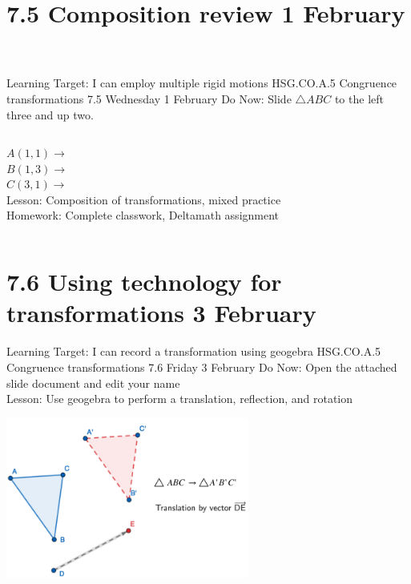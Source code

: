 \documentclass[onlytextwidth, aspectratio=169]{beamer}
\begin{document}
\section{7.5 Composition review \hfill 1 February \,}
\begin{frame}{Learning Target: I can employ multiple rigid motions}
  {HSG.CO.A.5 Congruence transformations \hfill \alert{7.5 Wednesday 1 February}}
  Do Now: Slide $\triangle ABC$ to the left three and up two.  \vspace{0.5cm}
  \begin{columns}
    $A(1,1) \rightarrow$ \\[0.3cm]
    $B(1,3) \rightarrow$ \\[0.3cm]
    $C(3,1) \rightarrow$ \\[0.3cm]
    Lesson: Composition of transformations, mixed practice \\[0.5cm]
    Homework: Complete classwork, Deltamath assignment
    \begin{flushright}
    \end{flushright}
  \end{columns}
\end{frame}

\section{7.6 Using technology for transformations \hfill 3 February \,}
\begin{frame}{Learning Target: I can record a transformation using geogebra}
  {HSG.CO.A.5 Congruence transformations \hfill \alert{7.6 Friday 3 February}}
  Do Now: Open the attached slide document and edit your name \\
  Lesson: Use geogebra to perform a translation, reflection, and rotation \\
  \begin{center}
    \includegraphics[width=8cm]{../graphics/7-6Geogebra.png}
  \end{center}
\end{frame}
\end{document}
